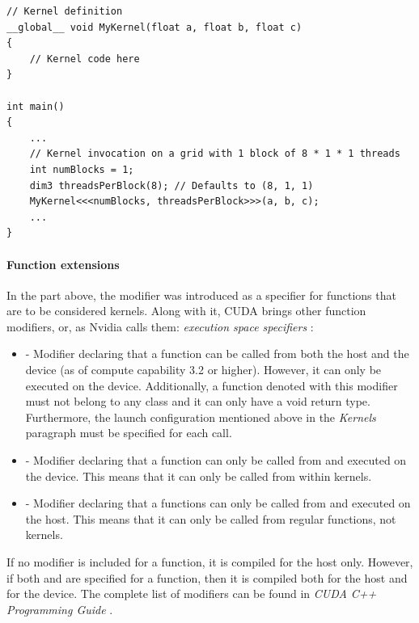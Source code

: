 \begin{lstlisting}[caption={Example of C++ pseudocode of a Kernel launch on a grid consisting of 1 one-dimensional block that is made up of 8 threads. Taken from Nvidia's \emph{CUDA C++ Programming Guide} \cite{NVIDIAMay2022}.},label={Listing:CUDA-kernel-example}]
// Kernel definition
__global__ void MyKernel(float a, float b, float c)
{
	// Kernel code here
}

int main()
{
	...
	// Kernel invocation on a grid with 1 block of 8 * 1 * 1 threads
	int numBlocks = 1;
	dim3 threadsPerBlock(8); // Defaults to (8, 1, 1)
	MyKernel<<<numBlocks, threadsPerBlock>>>(a, b, c);
	...
}
\end{lstlisting}

\paragraph{Function extensions}
In the part above, the  modifier was introduced as a specifier for functions that are to be considered kernels. Along with it, CUDA brings other function modifiers, or, as Nvidia calls them: \textit{execution space specifiers} \cite{NVIDIAMay2022}:

\begin{itemize}
	\item {} - Modifier declaring that a function can be called from both the host and the device (as of compute capability 3.2 or higher). However, it can only be executed on the device. Additionally, a function denoted with this modifier must not belong to any class and it can only have a void return type. Furthermore, the launch configuration mentioned above in the \textit{Kernels} paragraph must be specified for each call.
	\item {} - Modifier declaring that a function can only be called from and executed on the device. This means that it can only be called from within kernels.
	\item {} - Modifier declaring that a functions can only be called from and executed on the host. This means that it can only be called from regular functions, not kernels.
\end{itemize}

If no modifier is included for a function, it is compiled for the host only. However, if both  and  are specified for a function, then it is compiled both for the host and for the device. The complete list of modifiers can be found in \emph{CUDA C++ Programming Guide} \cite{NVIDIAMay2022}.

